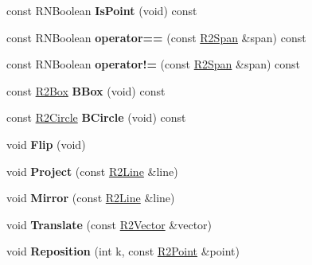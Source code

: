 \begin{DoxyCompactItemize}
\item 
const R\+N\+Boolean {\bfseries Is\+Point} (void) const \hypertarget{class_r2_span_a68ca8488236b27dbea15d5098cc1c4c5}{}\label{class_r2_span_a68ca8488236b27dbea15d5098cc1c4c5}

\item 
const R\+N\+Boolean {\bfseries operator==} (const \hyperlink{class_r2_span}{R2\+Span} \&span) const \hypertarget{class_r2_span_adc2a35b295b0b6fb828117d56bf7f3b7}{}\label{class_r2_span_adc2a35b295b0b6fb828117d56bf7f3b7}

\item 
const R\+N\+Boolean {\bfseries operator!=} (const \hyperlink{class_r2_span}{R2\+Span} \&span) const \hypertarget{class_r2_span_afcf9de48f8ec3dbadabdb8ba12a2845f}{}\label{class_r2_span_afcf9de48f8ec3dbadabdb8ba12a2845f}

\item 
const \hyperlink{class_r2_box}{R2\+Box} {\bfseries B\+Box} (void) const \hypertarget{class_r2_span_a480178f2b56db05406063a33cb01cf83}{}\label{class_r2_span_a480178f2b56db05406063a33cb01cf83}

\item 
const \hyperlink{class_r2_circle}{R2\+Circle} {\bfseries B\+Circle} (void) const \hypertarget{class_r2_span_a4edb9446e09abbf147caa97e4c4a289e}{}\label{class_r2_span_a4edb9446e09abbf147caa97e4c4a289e}

\item 
void {\bfseries Flip} (void)\hypertarget{class_r2_span_a0938a01442cbb5d355a42f219a193cde}{}\label{class_r2_span_a0938a01442cbb5d355a42f219a193cde}

\item 
void {\bfseries Project} (const \hyperlink{class_r2_line}{R2\+Line} \&line)\hypertarget{class_r2_span_a82b432085df4c048db092f2b01fe27e1}{}\label{class_r2_span_a82b432085df4c048db092f2b01fe27e1}

\item 
void {\bfseries Mirror} (const \hyperlink{class_r2_line}{R2\+Line} \&line)\hypertarget{class_r2_span_ae4c1aff9c394a92e598e59445635468a}{}\label{class_r2_span_ae4c1aff9c394a92e598e59445635468a}

\item 
void {\bfseries Translate} (const \hyperlink{class_r2_vector}{R2\+Vector} \&vector)\hypertarget{class_r2_span_aa5d8eabb8cb03f5085d04afbf30e9122}{}\label{class_r2_span_aa5d8eabb8cb03f5085d04afbf30e9122}

\item 
void {\bfseries Reposition} (int k, const \hyperlink{class_r2_point}{R2\+Point} \&point)\hypertarget{class_r2_span_acd88dbf022abc40eebc8f01be9212f8b}{}\label{class_r2_span_acd88dbf022abc40eebc8f01be9212f8b}


\end{DoxyCompactItemize}
